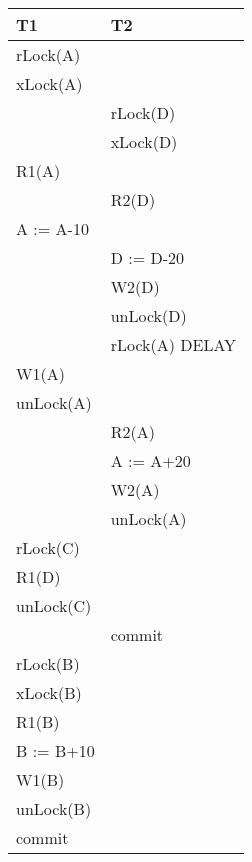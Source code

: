 \documentclass{bschlangaul-aufgabe}
\begin{document}
\begin{enumerate}
\begin{bAntwort}
\begin{tabular}{|l|l|}
\hline
T1             & T2                 \\\hline
rLock(A)       &                    \\
xLock(A)       &                    \\
               & rLock(D)           \\
               & xLock(D)           \\
R1(A)          &                    \\
               & R2(D)              \\
A := A-10      &                    \\
               & D := D-20          \\
               & W2(D)              \\
               & unLock(D)          \\
               & rLock(A) DELAY     \\
W1(A)          &                    \\
unLock(A)      &                    \\
               & R2(A)              \\
               & A := A+20          \\
               & W2(A)              \\
               & unLock(A)          \\
rLock(C)       &                    \\
R1(D)          &                    \\
unLock(C)      &                    \\
               & commit             \\
rLock(B)       &                    \\
xLock(B)       &                    \\
R1(B)          &                    \\
B := B+10      &                    \\
W1(B)          &                    \\
unLock(B)      &                    \\
commit         &                    \\
\hline
\end{tabular}

\end{bAntwort}

\end{enumerate}
\end{document}

